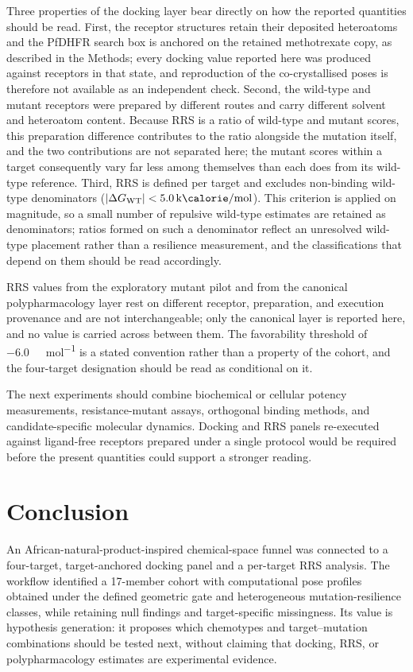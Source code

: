 \documentclass[journal=jcisd8,manuscript=article]{achemso}
\begin{document}
Three properties of the docking layer bear directly on how the reported quantities should be read. First, the receptor structures retain their deposited heteroatoms and the PfDHFR search box is anchored on the retained methotrexate copy, as described in the Methods; every docking value reported here was produced against receptors in that state, and reproduction of the co-crystallised poses is therefore not available as an independent check. Second, the wild-type and mutant receptors were prepared by different routes and carry different solvent and heteroatom content. Because RRS is a ratio of wild-type and mutant scores, this preparation difference contributes to the ratio alongside the mutation itself, and the two contributions are not separated here; the mutant scores within a target consequently vary far less among themselves than each does from its wild-type reference. Third, RRS is defined per target and excludes non-binding wild-type denominators ($|\Delta G_{\mathrm{WT}}| < \SI{5.0}{\kilo\calorie\per\mole}$). This criterion is applied on magnitude, so a small number of repulsive wild-type estimates are retained as denominators; ratios formed on such a denominator reflect an unresolved wild-type placement rather than a resilience measurement, and the classifications that depend on them should be read accordingly.

RRS values from the exploratory mutant pilot and from the canonical polypharmacology layer rest on different receptor, preparation, and execution provenance and are not interchangeable; only the canonical layer is reported here, and no value is carried across between them. The favorability threshold of \SI{-6.0}{\kilo\calorie\per\mole} is a stated convention rather than a property of the cohort, and the four-target designation should be read as conditional on it.

The next experiments should combine biochemical or cellular potency measurements, resistance-mutant assays, orthogonal binding methods, and candidate-specific molecular dynamics. Docking and RRS panels re-executed against ligand-free receptors prepared under a single protocol would be required before the present quantities could support a stronger reading.

\section{Conclusion}
An African-natural-product-inspired chemical-space funnel was connected to a four-target, target-anchored docking panel and a per-target RRS analysis. The workflow identified a 17-member cohort with computational pose profiles obtained under the defined geometric gate and heterogeneous mutation-resilience classes, while retaining null findings and target-specific missingness. Its value is hypothesis generation: it proposes which chemotypes and target--mutation combinations should be tested next, without claiming that docking, RRS, or polypharmacology estimates are experimental evidence.
\end{document}
